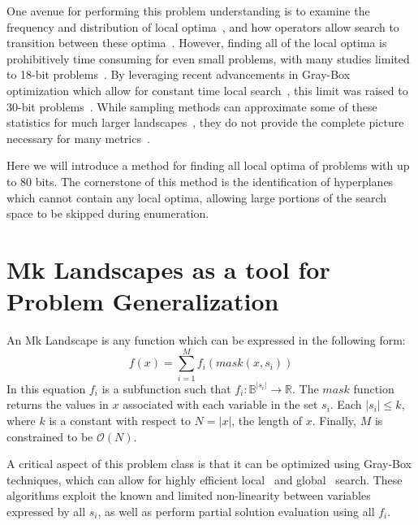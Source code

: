 \documentclass[runningheads,a4paper]{llncs}
\newcommand{\BigO}[1]{$\mathcal{O}{(#1)}$}
\begin{document}
One avenue for performing this problem understanding is to
examine the frequency and distribution of local optima~\cite{boese:1994:bigvalley},
and how operators allow search to transition between these
optima~\cite{tomassini:2008:nknetworks,verel:2011:nknetworks,ochoa:2015:crossovernetworks}.
However, finding all of the local optima is prohibitively time consuming
for even small problems, with many studies limited to 18-bit
problems~\cite{tomassini:2008:nknetworks,verel:2011:nknetworks}.
By leveraging recent advancements in Gray-Box optimization which allow for
constant time local search~\cite{chicano:2014:ball}, this limit was raised
to 30-bit problems~\cite{ochoa:2015:crossovernetworks}. While sampling
methods can approximate some of these statistics for much larger
landscapes~\cite{iclanzan:2014:somnetworks}, they do not provide the complete
picture necessary for many metrics~\cite{ochoa:2015:crossovernetworks}.

Here we will introduce a method for finding all local optima of problems
with up to 80 bits. The cornerstone of this method is the identification
of hyperplanes which cannot contain any local optima, allowing large
portions of the search space to be skipped during enumeration.



\section{Mk Landscapes as a tool for Problem Generalization}
An Mk Landscape is any function which can be expressed in the following form:
\begin{equation}
  f(x) = \sum_{i=1}^{M} f_i(mask(x, s_i))
  \label{eq-mk}
\end{equation}
In this equation $f_i$ is a subfunction such that $f_i : \mathbb{B}^{|s_i|}\rightarrow \mathbb{R}$.
The $mask$ function
returns the values in $x$ associated with each variable in the set $s_i$.
Each $|s_i| \leq k$, where $k$ is a constant with respect to $N=|x|$,
the length of $x$. Finally, $M$ is constrained to be \BigO{N}.

A critical aspect of this problem class is that it can be optimized using Gray-Box
techniques, which can allow for highly efficient local~\cite{whitley:2012:constant,chicano:2014:ball}
and global~\cite{goldman:2015:GBO,tintos:2015:partitioncross} search. These algorithms
exploit the known and limited non-linearity between variables expressed by all $s_i$,
as well as perform partial solution evaluation using all $f_i$.
\end{document}
